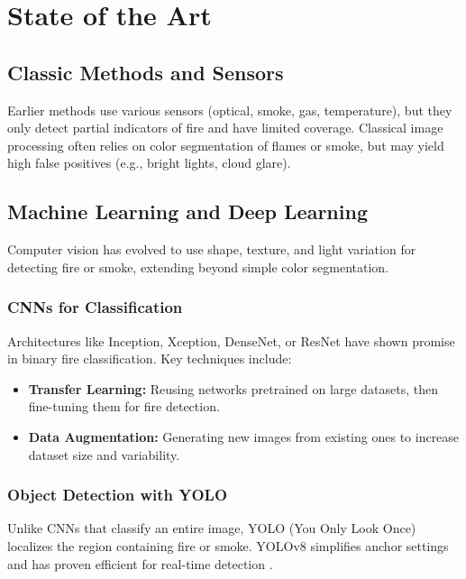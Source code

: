 \section{State of the Art}
\label{sec:sota}

\subsection{Classic Methods and Sensors}
\label{subsec:classic-methods}

Earlier methods use various sensors (optical, smoke, gas, temperature), but they only
detect partial indicators of fire and have limited coverage.
Classical image processing often relies on color segmentation of flames or smoke,
but may yield high false positives (e.g., bright lights, cloud glare).

\subsection{Machine Learning and Deep Learning}
\label{subsec:ml-dl}

Computer vision has evolved to use shape, texture, and light variation for detecting
fire or smoke, extending beyond simple color segmentation.

\subsubsection{CNNs for Classification}
Architectures like Inception, Xception, DenseNet, or ResNet have shown promise in
binary fire classification.
Key techniques include:
\begin{itemize}
    \item \textbf{Transfer Learning:} Reusing networks pretrained on large datasets, then
    fine-tuning them for fire detection.
    \item \textbf{Data Augmentation:} Generating new images from existing ones to increase
    dataset size and variability.
\end{itemize}

\subsubsection{Object Detection with YOLO}
Unlike CNNs that classify an entire image, YOLO (You Only Look Once) localizes
the region containing fire or smoke.
YOLOv8 simplifies anchor settings and has proven
efficient for real-time detection \cite{yaseen2024yolov8indepthexplorationinternal}.

